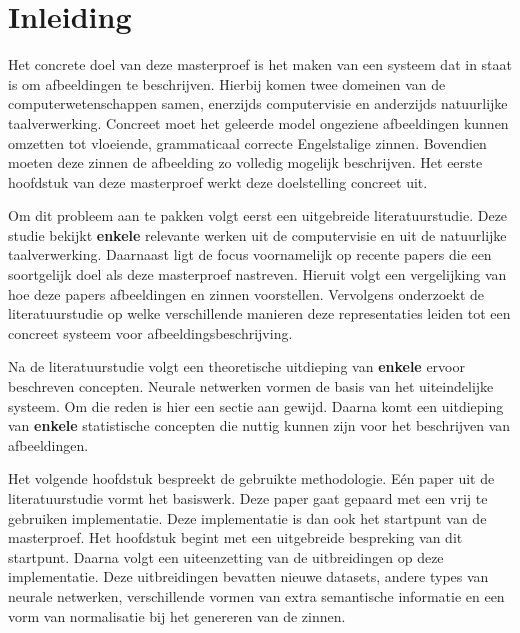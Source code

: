 \chapter{Inleiding}
\label{inleiding}

Het concrete doel van deze masterproef is het maken van een systeem dat in staat is om afbeeldingen te beschrijven. Hierbij komen twee domeinen van de computerwetenschappen samen, enerzijds computervisie en anderzijds natuurlijke taalverwerking. Concreet moet het geleerde model ongeziene afbeeldingen kunnen omzetten tot vloeiende, grammaticaal correcte Engelstalige zinnen. Bovendien moeten deze zinnen de afbeelding zo volledig mogelijk beschrijven. Het eerste hoofdstuk van deze masterproef werkt deze doelstelling concreet uit.


Om dit probleem aan te pakken volgt eerst een uitgebreide literatuurstudie. Deze studie bekijkt \textbf{enkele} relevante werken uit de computervisie en uit de natuurlijke taalverwerking. Daarnaast ligt de focus voornamelijk op recente papers die een soortgelijk doel als deze masterproef nastreven. Hieruit volgt een vergelijking van hoe deze papers afbeeldingen en zinnen voorstellen. Vervolgens onderzoekt de literatuurstudie op welke verschillende manieren deze representaties leiden tot een concreet systeem voor afbeeldingsbeschrijving.

Na de literatuurstudie volgt een theoretische uitdieping van \textbf{enkele} ervoor beschreven concepten. Neurale netwerken vormen de basis van het uiteindelijke systeem. Om die reden is hier een sectie aan gewijd. Daarna komt een uitdieping van \textbf{enkele} statistische concepten die nuttig kunnen zijn voor het beschrijven van afbeeldingen.

Het volgende hoofdstuk bespreekt de gebruikte methodologie.
E\'en paper uit de literatuurstudie vormt het basiswerk. Deze paper gaat gepaard met een vrij te gebruiken implementatie. Deze implementatie is dan ook het startpunt van de masterproef. Het hoofdstuk begint met een uitgebreide bespreking van dit startpunt.
Daarna volgt een uiteenzetting van de uitbreidingen op deze implementatie. Deze uitbreidingen bevatten nieuwe datasets, andere types van neurale netwerken, verschillende vormen van extra semantische informatie en een vorm van normalisatie bij het genereren van de zinnen.

